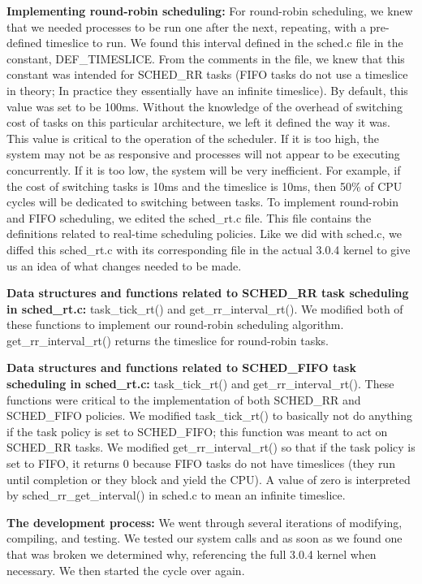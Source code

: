 \documentclass[letterpaper,10pt,titlepage]{article}
\newcommand{\ignore}[2]{\hspace{0in}#2} %
\newcommand{\tab}{\hspace*{2em}} %
\begin{document}
\begin{enumerate}
\tab \textbf{Implementing round-robin scheduling:} For round-robin scheduling, we knew that we needed processes to be run one after the next, repeating, with a pre-defined timeslice to run. We found this interval defined in the sched.c file in the constant, DEF\_TIMESLICE. From the comments in the file, we knew that this constant was intended for SCHED\_RR tasks (FIFO tasks do not use a timeslice in theory; In practice they essentially have an infinite timeslice). By default, this value was set to be 100ms. Without the knowledge of the overhead of switching cost of tasks on this particular architecture, we left it defined the way it was. This value is critical to the operation of the scheduler. If it is too high, the system may not be as responsive and processes will not appear to be executing concurrently. If it is too low, the system will be very inefficient. For example, if the cost of switching tasks is 10ms and the timeslice is 10ms, then 50\% of CPU cycles will be dedicated to switching between tasks. \ignore{[http://oreilly.com/catalog/linuxkernel/chapter/ch10.html]}

\tab To implement round-robin and FIFO scheduling, we edited the sched\_rt.c file. This file contains the definitions related to real-time scheduling policies. Like we did with sched.c, we diffed this sched\_rt.c with its corresponding file in the actual 3.0.4 kernel to give us an idea of what changes needed to be made.

\tab \textbf{Data structures and functions related to SCHED\_RR task scheduling in sched\_rt.c:} task\_tick\_rt() and get\_rr\_interval\_rt(). We modified both of these functions to implement our round-robin scheduling algorithm. get\_rr\_interval\_rt() returns the timeslice for round-robin tasks.
 
\tab \textbf{Data structures and functions related to SCHED\_FIFO task scheduling in sched\_rt.c:} task\_tick\_rt() and get\_rr\_interval\_rt(). These functions were critical to the implementation of both SCHED\_RR and SCHED\_FIFO policies. We modified task\_tick\_rt() to basically not do anything if the task policy is set to SCHED\_FIFO; this function was meant to act on SCHED\_RR tasks. We modified get\_rr\_interval\_rt() so that if the task policy is set to FIFO, it returns 0 because FIFO tasks do not have timeslices (they run until completion or they block and yield the CPU). A value of zero is interpreted by sched\_rr\_get\_interval() in sched.c to mean an infinite timeslice.

\tab \textbf{The development process:} We went through several iterations of modifying, compiling, and testing. We tested our system calls and as soon as we found one that was broken we determined why, referencing the full 3.0.4 kernel when necessary. We then started the cycle over again.


\end{enumerate}
\end{document}
